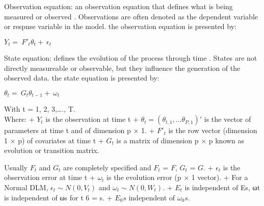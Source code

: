 \documentclass{ieeeojies}
\begin{document}
\begin{flushleft}
\hspace{0.4cm}Observation equation: an observation equation that defines what is being measured or observed \cite{dlm3}. Observations are often denoted as the dependent variable or respnse variable in the model. the observation equation is presented by:
\end{flushleft}\newline
\centering $Y_t=\ {F\prime}_t\theta_t+\ \epsilon_t$ 

\begin{flushleft}
\hspace{0.4cm}State equation: defines the evolution of the process through time \cite{dlm3}. States are not directly measureable or observable, but they influence the generation of the observed data. the state equation is presented by:
\end{flushleft}
\begin{center}
     $\theta_t=\ G_t\theta_{t-1}+\ \omega_t$
\end{center}
\begin{flushleft}
With t = 1, 2, 3,…., T. \\
Where:\newline
+ $Y_t$ is the observation at time t\newline
+ $\theta_t = (\theta_{t,1},… \theta_{P,1})'$ is the vector of parameters at time t and of dimension p × 1.\newline
+ ${F'}_t$ is the row vector (dimension 1 × p) of covariates at time t\newline
+ $G_t$ is a matrix of dimension p × p known as evolution or transition matrix.
\end{flushleft}
\begin{flushleft}
\hspace{0.4cm}Usually $F_t$ and $G_t$ are completely specified and $F_t$ =  $F$, $G_t$ = $G$.\newline
+ $\epsilon_t$ is the observation error at time t\newline
+ $\omega_t$ is the evolution error (p × 1 vector).\newline
+ For a Normal DLM, $\epsilon_t ∼ N(0, V_t)$ and ${\omega}_t ∼ N(0, W_t)$.\newline
+ $E_t$ is independent of Es, ωt is independent of ωs for t 6 = s. 
+ $E_0s$ independent of $\omega_0s$.\newline
\end{flushleft}
\end{document}
